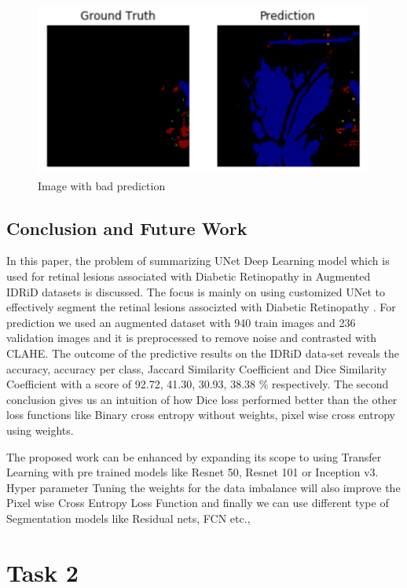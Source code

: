 \documentclass[conference]{IEEEtran}
\begin{document}
\begin{figure}[H]
	\centering
	\includegraphics[width=\linewidth]{image/bad.PNG}
	\caption{Image with bad prediction}
	\label{fig:bad}
\end{figure}

\subsection{Conclusion and Future Work}
In this paper, the problem of summarizing UNet Deep Learning model which is used for retinal lesions associated with Diabetic Retinopathy in Augmented IDRiD datasets is discussed. The focus is mainly on using customized UNet to effectively segment the retinal lesions associzted with Diabetic Retinopathy \cite{monoclonal1} . For prediction we used an augmented dataset with 940 train images and 236 validation images and it is preprocessed to remove noise and contrasted with CLAHE. The outcome of the predictive results on the IDRiD data-set reveals the accuracy, accuracy per class, Jaccard Similarity Coefficient and Dice Similarity Coefficient with a score of 92.72, 41.30, 30.93, 38.38 \% respectively. The second conclusion gives us an intuition of how Dice loss performed better than the other loss functions like Binary cross entropy without weights, pixel wise cross entropy using weights.
\par 
The proposed work can be enhanced by expanding its scope to using Transfer Learning with pre trained models like Resnet 50, Resnet 101 or Inception v3. Hyper parameter Tuning the weights for the data imbalance will also improve the Pixel wise Cross Entropy Loss Function and finally we can use different type of Segmentation models like Residual nets, FCN etc.,


\section{Task 2}
\end{document}
